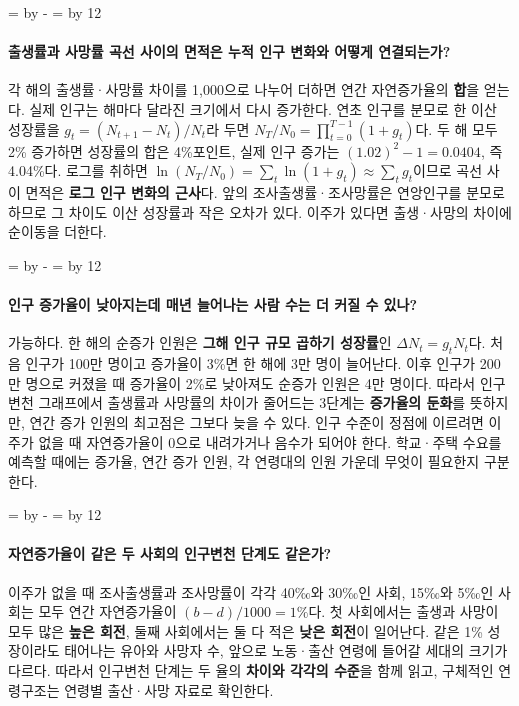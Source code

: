 \documentclass[10pt,a4paper]{article}
\newcommand{\ReserveQuestionSpace}{%
  \par\begingroup
  \dimen0=\pagegoal \advance\dimen0 by -\pagetotal
  \dimen2=\baselineskip \multiply\dimen2 by 12
  \ifdim\dimen0<\dimen2 \newpage\fi
  \endgroup}
\begin{document}
\ReserveQuestionSpace
\paragraph{출생률과 사망률 곡선 사이의 면적은 누적 인구 변화와 어떻게 연결되는가?}
각 해의 출생률·사망률 차이를 1,000으로 나누어 더하면 연간 자연증가율의 \textbf{합}을 얻는다. 실제 인구는 해마다 달라진 크기에서 다시 증가한다. 연초 인구를 분모로 한 이산 성장률을 $g_t=(N_{t+1}-N_t)/N_t$라 두면 $N_T/N_0=\prod_{t=0}^{T-1}(1+g_t)$다. 두 해 모두 2\% 증가하면 성장률의 합은 4\%포인트, 실제 인구 증가는 $(1.02)^2-1=0.0404$, 즉 4.04\%다. 로그를 취하면 $\ln(N_T/N_0)=\sum_t\ln(1+g_t)\approx\sum_t g_t$이므로 곡선 사이 면적은 \textbf{로그 인구 변화의 근사}다. 앞의 조사출생률·조사망률은 연앙인구를 분모로 하므로 그 차이도 이산 성장률과 작은 오차가 있다. 이주가 있다면 출생·사망의 차이에 순이동을 더한다.\par

\ReserveQuestionSpace
\paragraph{인구 증가율이 낮아지는데 매년 늘어나는 사람 수는 더 커질 수 있나?}
가능하다. 한 해의 순증가 인원은 \textbf{그해 인구 규모 곱하기 성장률}인 $\Delta N_t=g_tN_t$다. 처음 인구가 100만 명이고 증가율이 3\%면 한 해에 3만 명이 늘어난다. 이후 인구가 200만 명으로 커졌을 때 증가율이 2\%로 낮아져도 순증가 인원은 4만 명이다. 따라서 인구변천 그래프에서 출생률과 사망률의 차이가 줄어드는 3단계는 \textbf{증가율의 둔화}를 뜻하지만, 연간 증가 인원의 최고점은 그보다 늦을 수 있다. 인구 수준이 정점에 이르려면 이주가 없을 때 자연증가율이 0으로 내려가거나 음수가 되어야 한다. 학교·주택 수요를 예측할 때에는 증가율, 연간 증가 인원, 각 연령대의 인원 가운데 무엇이 필요한지 구분한다.\par

\ReserveQuestionSpace
\paragraph{자연증가율이 같은 두 사회의 인구변천 단계도 같은가?}
이주가 없을 때 조사출생률과 조사망률이 각각 40‰와 30‰인 사회, 15‰와 5‰인 사회는 모두 연간 자연증가율이 $(b-d)/1000=1\%$다. 첫 사회에서는 출생과 사망이 모두 많은 \textbf{높은 회전}, 둘째 사회에서는 둘 다 적은 \textbf{낮은 회전}이 일어난다. 같은 1\% 성장이라도 태어나는 유아와 사망자 수, 앞으로 노동·출산 연령에 들어갈 세대의 크기가 다르다. 따라서 인구변천 단계는 두 율의 \textbf{차이와 각각의 수준}을 함께 읽고, 구체적인 연령구조는 연령별 출산·사망 자료로 확인한다.\par
\end{document}
